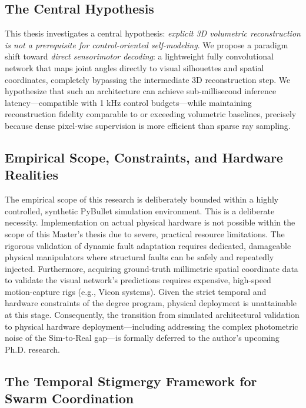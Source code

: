 \documentclass[12pt,a4paper,oneside]{report}
\begin{document}
\subsection{The Central Hypothesis}
\label{subsec:central_hypothesis_intro}

This thesis investigates a central hypothesis: \textit{explicit 3D volumetric reconstruction is not a prerequisite for control-oriented self-modeling}. We propose a paradigm shift toward \textit{direct sensorimotor decoding}: a lightweight fully convolutional network that maps joint angles directly to visual silhouettes and spatial coordinates, completely bypassing the intermediate 3D reconstruction step. We hypothesize that such an architecture can achieve sub-millisecond inference latency---compatible with 1 kHz control budgets---while maintaining reconstruction fidelity comparable to or exceeding volumetric baselines, precisely because dense pixel-wise supervision is more efficient than sparse ray sampling.

\subsection{Empirical Scope, Constraints, and Hardware Realities}
\label{subsec:empirical_scope_intro}

The empirical scope of this research is deliberately bounded within a highly controlled, synthetic PyBullet simulation environment. This is a deliberate necessity. Implementation on actual physical hardware is not possible within the scope of this Master's thesis due to severe, practical resource limitations. The rigorous validation of dynamic fault adaptation requires dedicated, damageable physical manipulators where structural faults can be safely and repeatedly injected. Furthermore, acquiring ground-truth millimetric spatial coordinate data to validate the visual network's predictions requires expensive, high-speed motion-capture rigs (e.g., Vicon systems). Given the strict temporal and hardware constraints of the degree program, physical deployment is unattainable at this stage. Consequently, the transition from simulated architectural validation to physical hardware deployment---including addressing the complex photometric noise of the Sim-to-Real gap---is formally deferred to the author's upcoming Ph.D. research.

\subsection{The Temporal Stigmergy Framework for Swarm Coordination}
\label{subsec:temporal_stigmergy_framework_intro}
\end{document}
